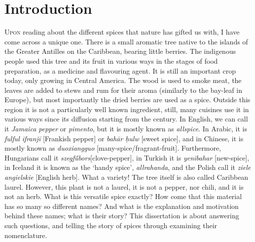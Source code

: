 



\chapter{Introduction}
\label{ch:introduction}



\lettrine[lines=\iniciale]{\textcolor{\accentcolor}{U}}{pon} reading about the different spices that nature has gifted us with, I have come across a unique one. There is a small aromatic tree native to the islands of the Greater Antilles on the Caribbean, bearing little berries. The indigenous people used this tree and its fruit in various ways in the stages of food preparation, as a medicine and flavouring agent. It is still an important crop today, only growing in Central America. The wood is used to smoke meat, the leaves are added to stews and rum for their aroma (similarly to the bay-leaf in Europe), but most importantly the dried berries are used as a spice. Outside this region it is not a particularly well known ingredient, still, many cuisines use it in various ways since its diffusion starting from the  century. In English, we can call it \textit{Jamaica pepper} or \textit{pimento}, but it is mostly known as \textit{allspice}. In Arabic, it is \textit{fulful ifranjī} [Frankish pepper] or \textit{bah\={a}r ḥulw} [sweet spice], and in Chinese, it is mostly known as \textit{duoxiangguo} [many-spice/fragrant-fruit]. Furthermore, Hungarians call it \textit{szegfűbors}[clove-pepper], in Turkish it is \textit{yenibahar} [new-spice], in Iceland it is known as the `handy spice', \textit{allrahanda}, and the Polish call it \textit{ziele angielskie} [English herb]. What a variety! The tree itself is also called Caribbean laurel. However, this plant is not a laurel, it is not a pepper, nor chili, and it is not an herb. What is this versatile spice exactly? How come that this material has so many so different names? And what is the explanation and motivation behind these names; what is their story? This dissertation is about answering such questions, and telling the story of spices through examining their nomenclature.

